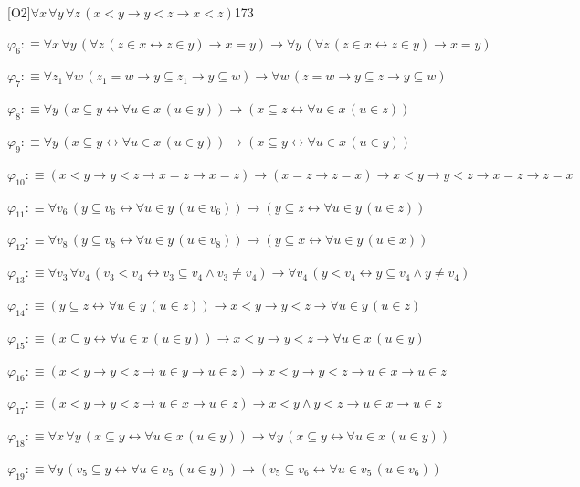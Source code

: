 \begin{fullproof}{[O2]}{$\forall x\,\forall y\,\forall z\,(x < y \to y < z \to x < z)$}{173}
\begin{abbrevlist}
\item $\varphi_{6} :\equiv \forall x\,\forall y\,(\forall z\,(z \in x \leftrightarrow z \in y) \to x = y) \to \forall y\,(\forall z\,(z \in x \leftrightarrow z \in y) \to x = y)$
\item $\varphi_{7} :\equiv \forall z_{1}\,\forall w\,(z_{1} = w \to y \subseteq z_{1} \to y \subseteq w) \to \forall w\,(z = w \to y \subseteq z \to y \subseteq w)$
\item $\varphi_{8} :\equiv \forall y\,(x \subseteq y \leftrightarrow \forall u \in x\,(u \in y)) \to (x \subseteq z \leftrightarrow \forall u \in x\,(u \in z))$
\item $\varphi_{9} :\equiv \forall y\,(x \subseteq y \leftrightarrow \forall u \in x\,(u \in y)) \to (x \subseteq y \leftrightarrow \forall u \in x\,(u \in y))$
\item $\varphi_{10} :\equiv (x < y \to y < z \to x = z \to x = z) \to (x = z \to z = x) \to x < y \to y < z \to x = z \to z = x$
\item $\varphi_{11} :\equiv \forall v_{6}\,(y \subseteq v_{6} \leftrightarrow \forall u \in y\,(u \in v_{6})) \to (y \subseteq z \leftrightarrow \forall u \in y\,(u \in z))$
\item $\varphi_{12} :\equiv \forall v_{8}\,(y \subseteq v_{8} \leftrightarrow \forall u \in y\,(u \in v_{8})) \to (y \subseteq x \leftrightarrow \forall u \in y\,(u \in x))$
\item $\varphi_{13} :\equiv \forall v_{3}\,\forall v_{4}\,(v_{3} < v_{4} \leftrightarrow v_{3} \subseteq v_{4} \land v_{3} \neq v_{4}) \to \forall v_{4}\,(y < v_{4} \leftrightarrow y \subseteq v_{4} \land y \neq v_{4})$
\item $\varphi_{14} :\equiv (y \subseteq z \leftrightarrow \forall u \in y\,(u \in z)) \to x < y \to y < z \to \forall u \in y\,(u \in z)$
\item $\varphi_{15} :\equiv (x \subseteq y \leftrightarrow \forall u \in x\,(u \in y)) \to x < y \to y < z \to \forall u \in x\,(u \in y)$
\item $\varphi_{16} :\equiv (x < y \to y < z \to u \in y \to u \in z) \to x < y \to y < z \to u \in x \to u \in z$
\item $\varphi_{17} :\equiv (x < y \to y < z \to u \in x \to u \in z) \to x < y \land y < z \to u \in x \to u \in z$
\item $\varphi_{18} :\equiv \forall x\,\forall y\,(x \subseteq y \leftrightarrow \forall u \in x\,(u \in y)) \to \forall y\,(x \subseteq y \leftrightarrow \forall u \in x\,(u \in y))$
\item $\varphi_{19} :\equiv \forall y\,(v_{5} \subseteq y \leftrightarrow \forall u \in v_{5}\,(u \in y)) \to (v_{5} \subseteq v_{6} \leftrightarrow \forall u \in v_{5}\,(u \in v_{6}))$

\end{abbrevlist}
\end{fullproof}
